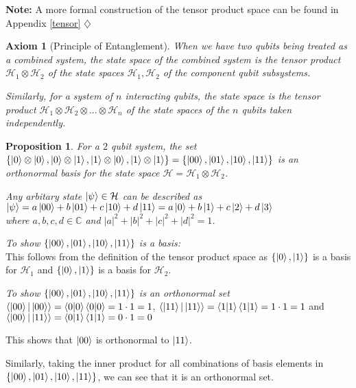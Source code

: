 \documentclass[12pt,twoside,fleqn]{report}
\makeatletter
\theoremstyle{thmstyle}
\renewenvironment{proof}[1][\proofname]{\par
\pushQED{\qed}%
\normalfont \topsep6\p@\@plus6\p@\relax
\trivlist
\item[\hskip\labelsep\itshape#1\@addpunct{.}]\mbox{}\par\nobreak\ignorespaces
}{%
    \popQED\endtrivlist\@endpefalse
    }
\newtheorem{prop}{Proposition}[chapter]
\newtheorem{axiom}{Axiom}[chapter]
\newenvironment{note}{\textbf{Note:}}{\hfill\ensuremath{\diamondsuit}}
\makeatother
\begin{document}
\begin{note}
    A more formal construction of the tensor product space can be found in Appendix \ref{tensor}
\end{note}



\begin{samepage}
    \begin{mdframed}
\begin{axiom}[Principle of Entanglement]
When we have two qubits being treated as a combined system, the state space of the combined system is the tensor product $\mathcal{H}_1 \otimes \mathcal{H}_2$ of the state spaces $\mathcal{H}_1, \mathcal{H}_2$ of the component qubit subsystems. 

    Similarly, for a system of $n$ interacting qubits, the state space is the tensor product $\mathcal{H}_1 \otimes \mathcal{H}_2 \otimes ... \otimes \mathcal{H}_n$ of the state spaces of the $n$ qubits taken independently.
\end{axiom}
    \end{mdframed}
\end{samepage}


\begin{prop}
    For a $2$ qubit system, the set $\{ \ket{0} \otimes \ket{0}, \ket{0} \otimes \ket{1}, \ket{1} \otimes \ket{0}, \ket{1} \otimes \ket{1} \} = \{ \ket{00}, \ket{01}, \ket{10}, \ket{11} \}$ is an orthonormal basis for the state space $\mathcal{H} = \mathcal{H}_1 \otimes \mathcal{H}_2$.

    Any arbitary state $\ket{\psi} \in \mathcal{H}$ can be described as $\ket{\psi} = a \ket{00} + b \ket{01} + c \ket{10} + d \ket{11} = a \ket{0} + b \ket{1} + c \ket{2} + d \ket{3}$ \\ where $a, b, c, d \in \mathbb{C}$ and $|a|^2 + |b|^2 + |c|^2 + |d|^2 = 1$.
\end{prop}
\begin{proof}
    \emph{To show  $\{ \ket{00}, \ket{01}, \ket{10}, \ket{11} \}$ is a basis: } \\

    This follows from the definition of the tensor product space as $\{ \ket{0}, \ket{1} \}$ is a basis for $\mathcal{H}_1$ and $\{ \ket{0}, \ket{1} \}$ is a basis for $\mathcal{H}_2$.

    \emph{To show $\{ \ket{00}, \ket{01}, \ket{10}, \ket{11} \}$ is an orthonormal set} \\
    $\braket{ \ket{00} | \ket{00}} = \braket{0|0} \braket{0|0} = 1 \cdot 1 = 1$, 
    $\braket{ \ket{11} | \ket{11}} = \braket{1|1} \braket{1|1} = 1 \cdot 1 = 1$
    and $\braket{ \ket{00} | \ket{11}} = \braket{0|1} \braket{1|1} = 0 \cdot 1 = 0$

    This shows that $\ket{00}$ is orthonormal to $\ket{11}$. 

    Similarly, taking the inner product for all combinations of basis elements in $\{ \ket{00}, \ket{01}, \ket{10}, \ket{11} \}$, we can see that it is an orthonormal set.
\end{proof}
\end{document}
